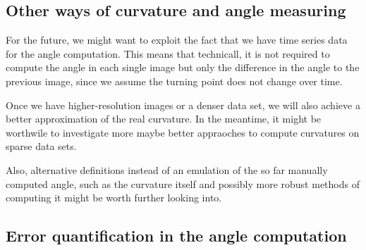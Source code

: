 \subsection{Other ways of curvature and angle measuring}


For the future, we might want to exploit the fact that we have time series data for the angle computation. This means that technicall, it is not required to compute the angle in each single image but only the difference in the angle to the previous image, since we assume the turning point does not change over time. 

Once we have higher-resolution images or a denser data set, we will also  achieve a better approximation of the real curvature. In the meantime, it might be worthwile to investigate more maybe better appraoches to compute curvatures on sparse data sets. 

Also, alternative definitions instead of an emulation of the so far manually computed angle, such as the curvature itself and possibly more robust methods of computing it might be worth further looking into. 
 

%
%




\subsection{Error quantification in the angle computation}

